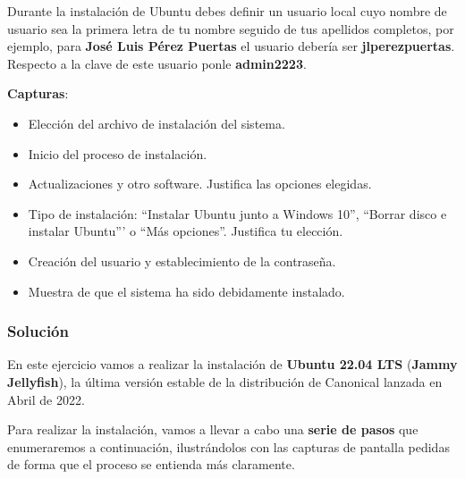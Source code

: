 Durante la instalación de Ubuntu debes definir un usuario local cuyo nombre de usuario sea la primera letra de tu nombre seguido de tus apellidos completos, por ejemplo, para \textbf{José Luis Pérez Puertas} el usuario debería ser \textbf{jlperezpuertas}. Respecto a la clave de este usuario ponle \textbf{admin2223}.

\textbf{Capturas}:
\begin{itemize}
    \item Elección del archivo de instalación del sistema.
    \item Inicio del proceso de instalación.
    \item Actualizaciones y otro software. Justifica las opciones elegidas.
    \item Tipo de instalación: ``Instalar Ubuntu junto a Windows 10'', ``Borrar disco e instalar Ubuntu''' o ``Más opciones''. Justifica tu elección.
    \item Creación del usuario y establecimiento de la contraseña.
    \item Muestra de que el sistema ha sido debidamente instalado.
\end{itemize}

\subsubsection{Solución}
En este ejercicio vamos a realizar la instalación de \textbf{Ubuntu 22.04 LTS} (\textbf{Jammy Jellyfish}), la última versión estable de la distribución de Canonical lanzada en Abril de 2022.

Para realizar la instalación, vamos a llevar a cabo una \textbf{serie de pasos} que enumeraremos a continuación, ilustrándolos con las capturas de pantalla pedidas de forma que el proceso se entienda más claramente.

